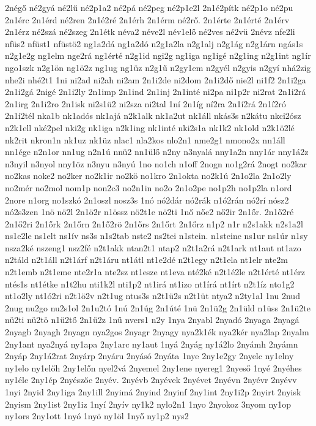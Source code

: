 {2négő
né2gyá
né2lű
né2p1a2
né2pá
né2peg
né2p1e2l
2n1é2pítk
né2p1o
né2pu
2n1érc
2n1érd
né2ren
2n1é2ré
2n1érh
2n1érm
né2rő.
2n1érte
2n1érté
2n1érv
2n1érz
né2szá
né2szeg
2n1étk
néva2
néve2l
név1elő
né2ves
né2vü
2névz
nfe2li
nfüs2
nfüst1
nfüstö2
ng1a2dá
ng1a2dó
n2g1a2la
n2g1alj
n2g1ág
n2g1árn
ngás1s
n2g1e2g
ng1elm
nge2rá
ng1érté
n2g1id
ngi2g
ng1iga
ng1igé
n2g1ing
n2g1int
ng1ír
ngo1szk
n2g1ön
ng1ö2z
ng1ug
ng1üz
n2g1ű
n2gy1em
n2gyél
n2gyis
n2gyí
nhá2zig
nhe2i
nhé2t1
1ni
ni2ad
ni2ah
ni2am
2n1i2de
ni2dom
2n1i2dő
nie2l
ni1f2
2n1i2ga
2n1i2gá
2nigé
2n1i2ly
2n1imp
2n1ind
2n1inj
2n1inté
ni2pa
ni1p2r
ni2rat
2n1i2rá
2n1irg
2n1i2ro
2n1isk
ni2s1ü2
ni2sza
ni2tal
1ní
2n1íg
ní2ra
2n1í2rá
2n1í2ró
2n1í2tél
nka1b
nk1adós
nk1ajá
n2k1alk
nk1a2ut
nk1áll
nkás3s
n2kátu
nkci2ósz
n2k1ell
nké2pel
nki2g
nk1iga
n2k1ing
nk1inté
nki2s1a
nk1k2
nk1old
n2k1ö2lé
nk2rit
nkron1n
nk1uz
nk1üz
nlac1
nla2kos
nlo2n1
nme2g1
nmono2x
nn1áll
nn1ége
n2n1or
nn1ug
n2n1ú
nnü2
nn1ülő
n2ny
n3nyalá
nny1a2n
nny1ár
nny1á2z
n3nyil
n3nyol
nny1öz
n3nyu
n3nyú
1no
no1ch
n1off
2nogn
no1g2rá
2nogt
no2kar
no2kas
noke2
no2ker
no2k1ir
no2kö
no1kro
2n1okta
no2k1ú
2n1o2la
2n1o2ly
no2mér
no2mol
nom1p
non2c3
no2n1in
no2o
2n1o2pe
no1p2h
no1p2la
n1ord
2nore
n1org
no1szkó
2n1oszl
nosz3s
1nó
nó2dár
nó2rák
n1ó2rán
nó2rí
nósz2
nó2s3zen
1nö
nö2l
2n1ö2r
n1össz
nö2t1e
nö2ti
1nő
nőe2
nő2ir
2n1őr.
2n1ő2ré
2n1ő2ri
2n1őrk
2n1őrn
2n1ő2rö
2n1őrs
2n1őrt
2n1őrz
n1p2
n1r
n2s1akk
n2s1a2l
ns1e2le
ns1elt
ns1ív
ns3s
n1s2tab
nste2
ns2tei
n1stein.
n1steine
ns1ur
ns1úr
n1sy
nsza2ké
nszeng1
nsz2fé
n2t1akk
ntan2t1
ntap2
n2t1a2rá
n2t1ark
nt1aut
nt1azo
n2táld
n2t1áll
n2t1árf
n2t1áru
nt1átl
nt1e2dé
n2t1egy
n2t1ela
nt1elr
nte2m
n2t1emb
n2t1eme
nte2r1a
nte2sz
nt1esze
nt1eva
nté2ké
n2t1é2le
n2t1érté
nt1érz
ntés1s
nt1étke
n1t2hu
nti1k2l
nti1p2
nt1irá
nt1izo
nt1írá
nt1írt
n2t1íz
nto1g2
nt1o2ly
nt1ó2ri
n2t1ö2v
n2t1ug
ntus3s
n2t1ü2s
n2t1üt
ntya2
n2ty1al
1nu
2nud
2nug
nu2go
nu2s1ol
2n1u2tó
1nú
2n1úg
2n1úté
1nü
2n1ü2g
2n1üld
n1üss
2n1ü2te
nü2ti
nü2tö
n1ü2tő
2n1ü2z
1nű
nvers1
n2y
1nya
2nyabl
2nyadó
2nyaga
2nyagá
2nyagb
2nyagh
2nyagn
nya2gos
2nyagr
2nyagy
nya2k1ék
nya2kér
nya2lap
2nyalm
2ny1ant
nya2nyá
ny1apa
2ny1arc
ny1aut
1nyá
2nyág
ny1á2lo
2nyámh
2nyámn
2nyáp
2ny1á2rat
2nyárp
2nyáru
2nyásó
2nyáta
1nye
2ny1e2gy
2nyelc
ny1elny
ny1elo
ny1előh
2ny1előn
nyel2vá
2nyemel
2ny1ene
nyereg1
2nyeső
1nyé
2nyéhes
ny1éle
2ny1ép
2nyészőe
2nyév.
2nyévb
2nyévek
2nyévet
2nyévn
2nyévr
2nyévv
1nyi
2nyid
2ny1iga
2ny1ill
2nyimá
2nyind
2nyinf
2ny1int
2ny1i2p
2nyirt
2nyisk
2nyism
2ny1ist
2ny1iz
1nyí
2nyív
ny1k2
nylo2n1
1nyo
2nyokoz
3nyom
ny1op
ny1ors
2ny1ott
1nyó
1nyö
ny1öl
1nyő
ny1p2
nys2
}
